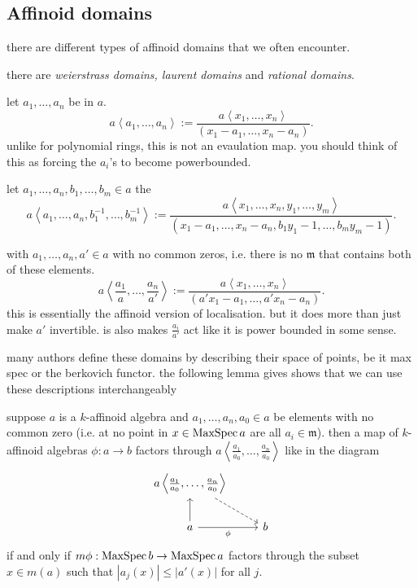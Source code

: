 \subsection{Affinoid domains} \label{sec:affinoid_domains}

there are different types of affinoid domains that we often encounter. 

\begin{definition}
		there are \emph{weierstrass domains, laurent domains} and \emph{rational domains}. 
	\begin{description}
		\item[weierstrass domain] let $a_1, \ldots, a_n$ be in $a$. 
			\[
				a\left<a_1, \ldots, a_n \right> := \frac{a\left<x_1, \ldots, x_n \right>}{(x_1-a_1, \ldots, x_n - a_n)}
			.\] 
			unlike for polynomial rings, this is not an evaulation map. you should think of this as forcing the $a_i$'s to become powerbounded. 
		\item [laurent domains]
			let $a_1, \ldots, a_n, b_1, \ldots, b_m \in a$ the \[
				a\left<a_1, \ldots, a_n, b_1^{-1}, \ldots, b_m^{-1} \right> := \frac{a\left<x_1, \ldots, x_n,y_1, \ldots, y_m  \right>}{(x_1 - a_1, \ldots, x_n - a_n, b_1 y_1 - 1, \ldots, b_m y_m - 1)}
			.\] 
		\item[rational domain] with $a_1, \ldots, a_n, a' \in a$ with no common zeros, i.e. there is no $\mathfrak{m} $ that contains both of these elements.   
			\[
				a \left<\frac{a_1}{a}, \ldots, \frac{a_n}{a'} \right> := \frac{a\left<x_1, \ldots, x_n \right>}{(a' x_1 - a_1, \ldots, a' x_n - a_n)}
			.\] 
			this is essentially the affinoid version of localisation.
			but it does more than just make $a'$ invertible. 
			is also makes $\frac{a_i}{ a'}$ act like it is power bounded in some sense. 
		\item 
	\end{description}

\end{definition}
many authors define these domains by describing their space of points, be it max spec or the berkovich functor. 
the following lemma gives shows that we can use these descriptions interchangeably
\begin{lemma}
	suppose $a$ is a $k$-affinoid algebra and $a_1, \ldots, a_n, a_0 \in a$ be elements with no common zero (i.e. at no point in $ x \in \operatorname{MaxSpec} a$ are all $a_{i} \in \mathfrak{m}$).
	 then a map of $k$-affinoid algebras $\phi: a \to b$ factors through $a \left<\frac{a_1}{a_0}, \ldots, \frac{a_n}{a_0} \right>$ like in the diagram \[
	 \begin{tikzcd}
		 a \left<\frac{a_1}{a_0}, \ldots, \frac{a_n}{a_0} \right> \drar[dashed]  \\
		 a \uar \rar[']{\phi} & b
	 \end{tikzcd}
	 \] 
	 if and only if  $m\phi: \operatorname{MaxSpec} b \to \operatorname{MaxSpec} a$ factors through the subset $x \in m(a)$ such that $|a_j(x)| \le |a'(x)|$ for all $j$. 
\end{lemma}

